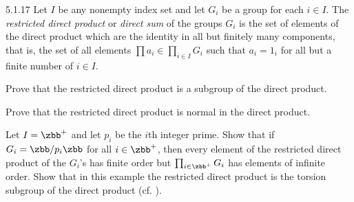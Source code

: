 \begin{exercise}{5.1.17}
    Let $I$ be any nonempty index set and let $G_i$ be a group for each $i \in I$.
	The \emph{restricted direct product} or \emph{direct sum} of the groups $G_i$ is the set of elements of the direct product which are the identity in all but finitely many components, that is, the set of all elements $\prod a_i \in \prod_{i \in I} G_i$ such that $a_i = 1_i$ for all but a finite number of $i \in I$.
    \begin{subexercises}
        \item Prove that the restricted direct product is a subgroup of the direct product.
        \item Prove that the restricted direct product is normal in the direct product.
        \item Let $I = \zbb^+$ and let $p_i$ be the $i$th integer prime.
	    Show that if $G_i = \zbb/p_i\zbb$ for all $i \in \zbb^+$, then every element of the restricted direct product of the $G_i$'s has finite order but $\prod_{i \in \zbb^+} G_i$ has elements of infinite order.
	    Show that in this example the restricted direct product is the torsion subgroup of the direct product (cf. ).
    \end{subexercises}
\end{exercise}


